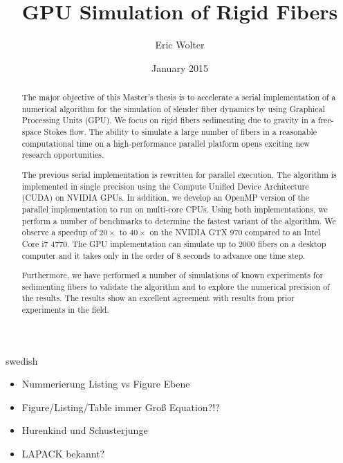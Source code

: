 \documentclass[a4paper,11pt]{kth-mag}
\title{GPU Simulation of Rigid Fibers}
\author{Eric Wolter}
\date{January 2015}
\begin{document}
\frontmatter
\pagestyle{empty}

\maketitle
{}
\begin{abstract}
The major objective of this Master's thesis is to accelerate a serial implementation of a numerical algorithm for the simulation of slender fiber dynamics by using Graphical Processing Units (GPU). We focus on rigid fibers sedimenting due to gravity in a free-space Stokes flow. The ability to simulate a large number of fibers in a reasonable computational time on a high-performance parallel platform opens exciting new research opportunities.

The previous serial implementation is rewritten for parallel execution. The algorithm is implemented in single precision using the Compute Unified Device Architecture (CUDA) on NVIDIA GPUs. In addition, we develop an OpenMP version of the parallel implementation to run on multi-core CPUs. Using both implementations, we perform a number of benchmarks to determine the fastest variant of the algorithm. We observe a speedup of $20×$ to $40×$ on the NVIDIA GTX 970 compared to an Intel Core i7 4770. The GPU implementation can simulate up to $2000$ fibers on a desktop computer and it takes only in the order of $8$ seconds to advance one time step.

Furthermore, we have performed a number of simulations of known experiments for sedimenting fibers to validate the algorithm and to explore the numerical precision of the results. The results show an excellent agreement with results from prior experiments in the field.
\end{abstract}

\clearpage


\begin{foreignabstract}{swedish}

\begin{itemize}
\item Nummerierung Listing vs Figure Ebene
\item Figure/Listing/Table immer Groß Equation?!?
\item Hurenkind und Schusterjunge
\item LAPACK bekannt?
\end{itemize}

\end{foreignabstract}

\clearpage
\end{document}
